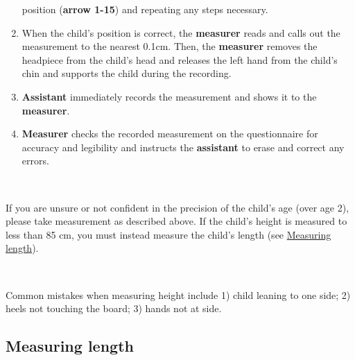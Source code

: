 \documentclass[12pt,]{book}
\theoremstyle{definition}
\theoremstyle{definition}
\theoremstyle{definition}
\theoremstyle{remark}
\let\BeginKnitrBlock\begin \let\EndKnitrBlock\end
\begin{document}
\begin{enumerate}
  position (\textbf{arrow 1-15}) and repeating any steps necessary.
\item
  When the child's position is correct, the \textbf{measurer} reads and
  calls out the measurement to the nearest 0.1cm. Then, the
  \textbf{measurer} removes the headpiece from the child's head and
  releases the left hand from the child's chin and supports the child
  during the recording.
\item
  \textbf{Assistant} immediately records the measurement and shows it to
  the \textbf{measurer}.
\item
  \textbf{Measurer} checks the recorded measurement on the questionnaire
  for accuracy and legibility and instructs the \textbf{assistant} to
  erase and correct any errors.
\end{enumerate}

~

\BeginKnitrBlock{rmdnote}
If you are unsure or not confident in the precision of the child's age
(over age 2), please take measurement as described above. If the child's
height is measured to less than 85 cm, you must instead measure the
child's length (see \protect\hyperlink{measuring-length}{Measuring
length}).
\EndKnitrBlock{rmdnote}

~

\BeginKnitrBlock{rmdwarning}
Common mistakes when measuring height include 1) child leaning to one
side; 2) heels not touching the board; 3) hands not at side.
\EndKnitrBlock{rmdwarning}

\hypertarget{measuring-length}{%
\subsection{Measuring length}\label{measuring-length}}
\end{document}
